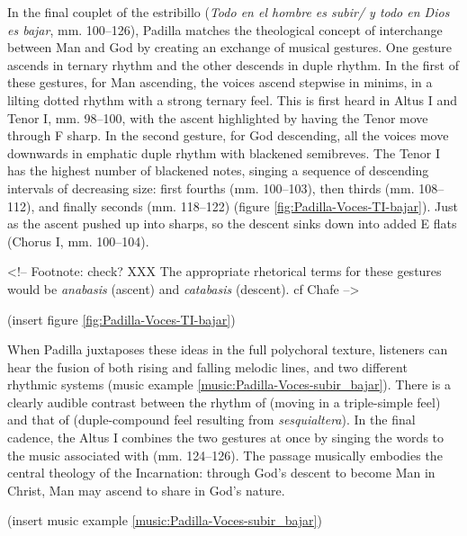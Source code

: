 In the final couplet of the estribillo (\emph{Todo en el hombre es subir/ y todo en
Dios es bajar}, mm. 100--126), Padilla matches the theological concept of
interchange between Man and God by creating an exchange of musical
gestures.
One gesture ascends in ternary rhythm and the other descends in duple rhythm.
In the first of these gestures, for Man ascending, the voices ascend stepwise in
minims, in a lilting dotted rhythm with a strong ternary feel.
This is first heard in Altus I and Tenor I, mm. 98--100, with the ascent
highlighted by having the Tenor move through F sharp.
In the second gesture, for God descending, all the voices move downwards in
emphatic duple rhythm with blackened semibreves.
The Tenor I has the highest number of blackened notes, singing a sequence of
descending intervals of decreasing size: first fourths (mm. 100--103), then
thirds (mm. 108--112), and finally seconds (mm. 118--122) (figure
\ref{fig:Padilla-Voces-TI-bajar}).
Just as the ascent pushed up into sharps, so the descent sinks down into added
E flats (Chorus I, mm. 100--104).

<!-- Footnote: check? XXX
The appropriate rhetorical terms for these gestures would be \emph{anabasis} (ascent) and
\emph{catabasis} (descent).
cf Chafe
-->

(insert figure \ref{fig:Padilla-Voces-TI-bajar})
\label{fig:Padilla-Voces-TI-bajar}

When Padilla juxtaposes these ideas in the full polychoral texture, listeners
can hear the fusion of both rising and falling melodic lines, and two different
rhythmic systems (music example \ref{music:Padilla-Voces-subir_bajar}).
There is a clearly audible contrast between the rhythm of 
(moving in a triple-simple feel) and that of  (duple-compound
feel resulting from \emph{sesquialtera}).
In the final cadence, the Altus I combines the two gestures at once by singing the words  to the music associated with  (mm. 124--126).
The passage musically embodies the central theology of the Incarnation: through
God's descent to become Man in Christ, Man may ascend to share in God's nature.

(insert music example \ref{music:Padilla-Voces-subir_bajar})
\label{music:Padilla-Voces-subir_bajar}

